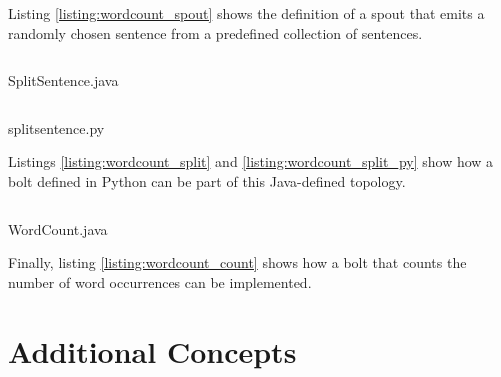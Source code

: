 \documentclass[bsc,logo,frontabs,twoside,singlespacing,normalheadings,parskip]{infthesis}     %
\begin{document}
Listing \ref{listing:wordcount_spout} shows the definition of a spout that emits a randomly chosen sentence from a predefined collection of sentences.

\newpage

\begin{listing}[!htb]
\inputminted{java}{code/SplitSentence.java}
\caption{SplitSentence.java}
\label{listing:wordcount_split}
\end{listing}

\begin{listing}[!htb]
\inputminted{python}{code/splitsentence.py}
\caption{splitsentence.py}
\label{listing:wordcount_split_py}
\end{listing}

Listings \ref{listing:wordcount_split} and \ref{listing:wordcount_split_py} show how a bolt defined in Python can be part of this Java-defined topology.

\newpage

\begin{listing}[!htb]
\inputminted{java}{code/WordCount.java}
\caption{WordCount.java}
\label{listing:wordcount_count}
\end{listing}

Finally, listing \ref{listing:wordcount_count} shows how a bolt that counts the number of word occurrences can be implemented.


\section{Additional Concepts}
\end{document}
